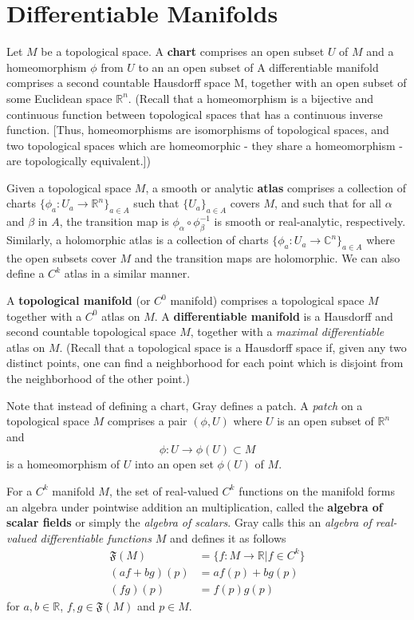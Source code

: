 \documentclass{book}
\begin{document}
	\chapter{Differentiable Manifolds}
	
		Let $M$ be a topological space. A \textbf{chart} comprises an open subset $U$ of $M$ and a homeomorphism $\phi$ from $U$ to an an open subset of  A differentiable manifold comprises a second countable Hausdorff space M, together with an open subset of some Euclidean space $\mathbb{R}^n$. (Recall that a homeomorphism is a bijective and continuous function between topological spaces that has a continuous inverse function. [Thus, homeomorphisms are isomorphisms of topological spaces, and two topological spaces which are homeomorphic - they share a homeomorphism - are topologically equivalent.])
		
		Given a topological space $M$, a smooth or analytic \textbf{atlas} comprises a collection of charts $\{\phi_a:U_a\rightarrow\mathbb{R}^n\}_{a\in A}$ such that $\{U_a\}_{a\in A}$ covers $M$, and such that for all $\alpha$ and $\beta$ in $A$, the transition map is $\phi_\alpha\circ\phi_\beta^{-1}$ is smooth or real-analytic, respectively. Similarly, a holomorphic atlas is a collection of charts $\{\phi_a:U_a\rightarrow\mathbb{C}^n\}_{a\in A}$ where the open subsets cover $M$ and the transition maps are holomorphic. We can also define a $C^k$ atlas in a similar manner.
		
		A \textbf{topological manifold} (or $C^0$ manifold) comprises a topological space $M$ together with a $C^0$ atlas on $M$. A \textbf{differentiable manifold} is a Hausdorff and second countable topological space $M$, together with a \emph{maximal differentiable} atlas on $M$. (Recall that a topological space is a Hausdorff space if, given any two distinct points, one can find a neighborhood for each point which is disjoint from the neighborhood of the other point.)
		
		Note that instead of defining a chart, Gray defines a patch. A \emph{patch} on a topological space $M$ comprises a pair $(\phi, U)$ where $U$ is an open subset of $\mathbb{R}^n$ and
		\begin{equation}
			\phi:U\rightarrow\phi(U)\subset M
		\end{equation}
		is a homeomorphism of $U$ into an open set $\phi(U)$ of $M$.
		
		For a $C^k$ manifold $M$, the set of real-valued $C^k$ functions on the manifold forms an algebra under pointwise addition an multiplication, called the \textbf{algebra of scalar fields} or simply the \emph{algebra of scalars}. Gray calls this an \emph{algebra of real-valued differentiable functions} $M$ and defines it as follows
		\begin{align}
			\mathfrak{F}(M)&=\{f:M\rightarrow\mathbb{R}|f\in C^k\}\\
			(af+bg)(p)&=af(p)+bg(p)\\
			(fg)(p)&=f(p)g(p)
		\end{align}
		for $a,b\in\mathbb{R}$, $f,g\in\mathfrak{F}(M)$ and $p\in M$.
		
\end{document}

